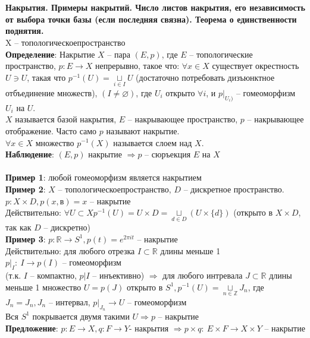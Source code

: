 	\section{} 
	\textbf{Накрытия. Примеры накрытий. Число листов накрытия, его независимость от выбора точки базы (если последняя связна). Теорема о единственности поднятия.}\\
	X -- топологическоепространство
	\\
	\textbf{Определение}: Накрытие $X$ -- пара $(E, p)$, где $E$ -- топологические пространство, $p: E \rightarrow X$ непрерывно, такое что: $\forall x\in X$ существует окрестность $U \ni U$, такая что $p^{-1} (U) = \underset{i\in I}{\sqcup} U$ (достаточно потребовать дизъюнктное отбъединение множеств), $(I \neq \varnothing)$, где $U_i$ открыто $\forall i$, и ${p|}_{U_i)}$ -- гомеоморфизм $U_i$ на $U$.\\
	$X$ называется базой накрытия, $E$ -- накрывающее пространство, $p$ -- накрывающее отображение. Часто само $p$ называют накрытие.\\
	$\forall x\in X$ множество $p^{-1} (X)$ называется слоем над $X$.\\
	\textbf{Наблюдение}: $(E,p)$ накрытие $\Rightarrow p$ -- сюръекция $E$ на $X$\\
	\\
	\textbf{Пример 1}: любой гомеоморфизм является накрытием\\
	\textbf{Пример 2}: $X$ -- топологическоепространство, $D$ -- дискретное пространство. $p: X\times D, p(x, в) = x$ -- накрытие\\
	Действительно: $\forall U \subset X p^{-1} (U) = U\times D = \underset{d\in D}{\sqcup} (U \times \{ d\})$ (открыто в $X\times D$, так как $D$ -- дискретно)\\
	\textbf{Пример 3}: $p: \mathbb{R} \rightarrow S^1, p(t) = e^{2\pi it}$ -- накрытие\\
	Действительно: для любого отрезка $I\subset \mathbb{R}$ длины меньше 1\\
	${p|}_I:\ I \rightarrow p(I)$ -- гомеоморфизм\\
	(т.к. $I$ -- компактно, $p|{I}$ -- инъективно) $\Rightarrow$ для любого интревала $J \subset \mathbb{R}$ длины меньше 1 множество $U = p(J)$ открыто в $S^1, p^{-1} (U) = \underset{n\in \mathbb{Z}}{\sqcup} J_n$, где $J_n = J_n, J_n$ -- интервал, ${p|}_{J_n} \rightarrow U$ -- гомеоморфизм\\
	Вся $S^1$ покрывается двумя такими $U \Rightarrow p$ -- накрытие\\
	\textbf{Предложение}: $p: E\rightarrow X, q: F\rightarrow Y$- накрытия $\Rightarrow p\times q:\ E\times F \rightarrow X\times Y$ -- накрытие\\
